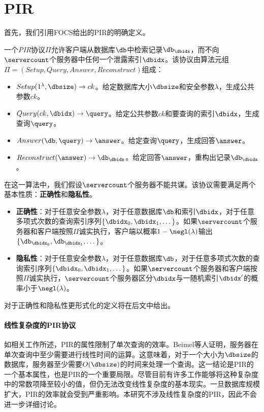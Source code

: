 \section{PIR}

首先，我们引用FOCS\cite{FOCS:CGKS95}给出的PIR的明确定义。

\begin{definition}[PIR]
    一个\textit{PIR}协议$\Pi$允许客户端从数据库$\db$中检索记录$\db_\dbidx$，而不向$\servercount$个服务器中任何一个泄露索引$\dbidx$。该协议由算法元组$\Pi = (Setup, Query, Answer, Reconstruct)$组成：
    \begin{itemize}
        \item $Setup(1^\lambda,\dbsize) \rightarrow ck$。给定数据库大小$\dbsize$和安全参数$\lambda$，生成公共参数$ck$。
        \item $Query(ck, \dbidx) \rightarrow \query$。给定公共参数$ck$和要查询的索引$\dbidx$，生成查询$\query$。
        \item $Answer(\db, \query) \rightarrow \answer$。给定查询$\query$，生成回答$\answer$。
        \item $Reconstruct(\answer) \rightarrow \db_\dbidx$。给定回答$\answer$，重构出记录$\db_\dbidx$。
    \end{itemize}
    在这一算法中，我们假设$\servercount$个服务器不能共谋。该协议需要满足两个基本性质：\textbf{正确性}和\textbf{隐私性}。
    \begin{itemize}
        \item \textbf{正确性}：对于任意安全参数$\lambda$，对于任意数据库$\db$和索引$\dbidx$，对于任意多项式次数的查询索引序列$\{\dbidx_0,\dbidx_1, \dots\}$。如果$\servercount$个服务器和客户端按照$\Pi$诚实执行，客户端以概率$1-\negl(\lambda)$输出$\{\db_{\dbidx_0},\db_{\dbidx_1}, \dots\}$。
        \item \textbf{隐私性}：对于任意安全参数$\lambda$，对于任意数据库$\db$，对于任意多项式次数的查询索引序列$\{\dbidx_0,\dbidx_1, \dots\}$。如果$\servercount$个服务器和客户端按照$\Pi$诚实执行，$\servercount$个服务器区分$\dbidx$与一随机索引$\dbidx'$的概率小于$\negl(\lambda)$。
    \end{itemize}
    对于正确性和隐私性更形式化的定义将在后文中给出。
\end{definition}

\paragraph{线性复杂度的PIR协议}
如相关工作所述，PIR的属性限制了单次查询的效率。Beimel\cite{C:BeiIshMal00}等人证明，服务器在单次查询中至少需要进行线性时间的运算。这意味着，对于一个大小为$\dbsize$的数据库，服务器至少需要$O(\dbsize)$的时间来处理一个查询。这一结论是PIR的一个基本属性，也是PIR的一个重要局限。尽管目前有许多工作能够将这种复杂度中的常数项降至较小的值，但仍无法改变线性复杂度的基本现实。一旦数据库规模扩大，PIR的效率就会受到严重影响。本研究不涉及线性复杂度的PIR，因此不会进一步详细讨论。

